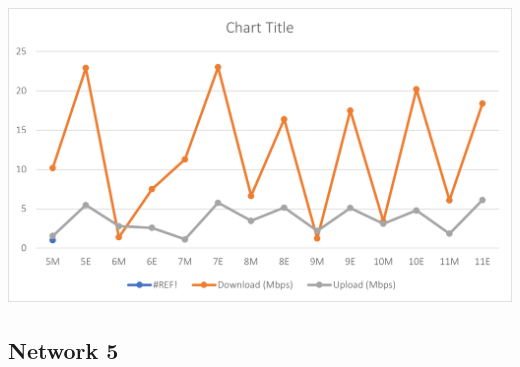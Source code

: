 \documentclass{article}
\begin{document}
\includegraphics[]{prakharair.png}
\pagebreak
\subsection{Network 5}
\end{document}
